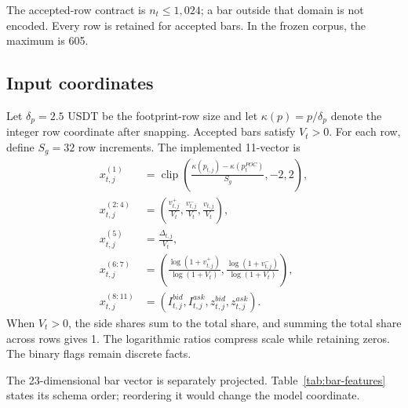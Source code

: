 \documentclass[10pt]{article}
\newcommand{\clip}{\operatorname{clip}}
\begin{document}
The accepted-row contract is $n_t\le1{,}024$; a bar outside that domain is not encoded. Every row is
retained for accepted bars. In the frozen corpus, the maximum is 605.

\subsection{Input coordinates}

Let $\delta_p=2.5$ USDT be the footprint-row size and let
$\kappa(p)=p/\delta_p$ denote the integer row coordinate after snapping. Accepted bars satisfy
$V_t>0$. For each row, define $S_g=32$ row increments. The implemented 11-vector is
\begin{align}
x_{t,j}^{(1)}&=\clip\!\left(\frac{\kappa(p_{t,j})-\kappa(p_t^{POC})}{S_g},-2,2\right),\\
x_{t,j}^{(2:4)}&=\left(\frac{v^+_{t,j}}{V_t},\frac{v^-_{t,j}}{V_t},
\frac{v_{t,j}}{V_t}\right),\\
x_{t,j}^{(5)}&=\frac{\Delta_{t,j}}{V_t},\\
x_{t,j}^{(6:7)}&=\left(\frac{\log(1+v^+_{t,j})}{\log(1+V_t)},
\frac{\log(1+v^-_{t,j})}{\log(1+V_t)}\right),\\
x_{t,j}^{(8:11)}&=(I^{bid}_{t,j},I^{ask}_{t,j},z^{bid}_{t,j},z^{ask}_{t,j}).
\label{eq:row-features}
\end{align}
When $V_t>0$, the side shares sum to the total share, and summing the total share across rows gives 1.
The logarithmic ratios compress scale while retaining zeros. The binary flags remain discrete facts.

The 23-dimensional bar vector is separately projected. Table~\ref{tab:bar-features} states its
schema order; reordering it would change the model coordinate.
\end{document}
